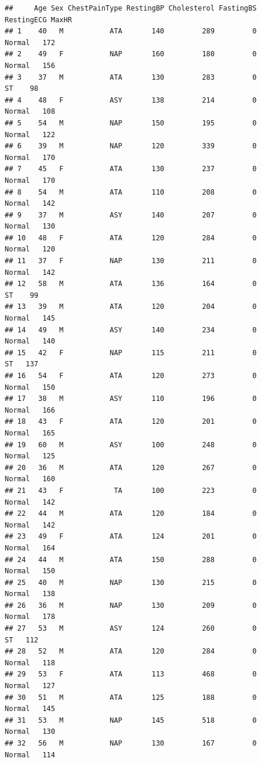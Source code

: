 \documentclass[
]{article}
\begin{document}
\begin{verbatim}
##     Age Sex ChestPainType RestingBP Cholesterol FastingBS RestingECG MaxHR
## 1    40   M           ATA       140         289         0     Normal   172
## 2    49   F           NAP       160         180         0     Normal   156
## 3    37   M           ATA       130         283         0         ST    98
## 4    48   F           ASY       138         214         0     Normal   108
## 5    54   M           NAP       150         195         0     Normal   122
## 6    39   M           NAP       120         339         0     Normal   170
## 7    45   F           ATA       130         237         0     Normal   170
## 8    54   M           ATA       110         208         0     Normal   142
## 9    37   M           ASY       140         207         0     Normal   130
## 10   48   F           ATA       120         284         0     Normal   120
## 11   37   F           NAP       130         211         0     Normal   142
## 12   58   M           ATA       136         164         0         ST    99
## 13   39   M           ATA       120         204         0     Normal   145
## 14   49   M           ASY       140         234         0     Normal   140
## 15   42   F           NAP       115         211         0         ST   137
## 16   54   F           ATA       120         273         0     Normal   150
## 17   38   M           ASY       110         196         0     Normal   166
## 18   43   F           ATA       120         201         0     Normal   165
## 19   60   M           ASY       100         248         0     Normal   125
## 20   36   M           ATA       120         267         0     Normal   160
## 21   43   F            TA       100         223         0     Normal   142
## 22   44   M           ATA       120         184         0     Normal   142
## 23   49   F           ATA       124         201         0     Normal   164
## 24   44   M           ATA       150         288         0     Normal   150
## 25   40   M           NAP       130         215         0     Normal   138
## 26   36   M           NAP       130         209         0     Normal   178
## 27   53   M           ASY       124         260         0         ST   112
## 28   52   M           ATA       120         284         0     Normal   118
## 29   53   F           ATA       113         468         0     Normal   127
## 30   51   M           ATA       125         188         0     Normal   145
## 31   53   M           NAP       145         518         0     Normal   130
## 32   56   M           NAP       130         167         0     Normal   114

\end{verbatim}
\end{document}
